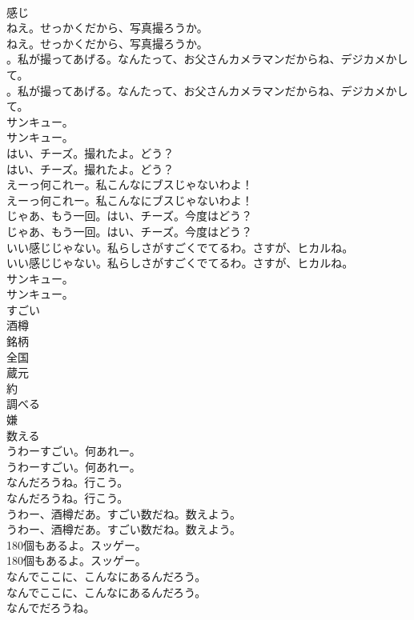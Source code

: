 \documentclass[8pt]{extreport}
\begin{document}
\begin{CJK}{UTF8}{min}
\\	感じ
\\	ねえ。せっかくだから、写真撮ろうか。	
\\	ねえ。せっかくだから、写真撮ろうか。 
\\	。私が撮ってあげる。なんたって、お父さんカメラマンだからね、デジカメかして。	
\\	。私が撮ってあげる。なんたって、お父さんカメラマンだからね、デジカメかして。 
\\	サンキュー。	
\\	サンキュー。 
\\	はい、チーズ。撮れたよ。どう？	
\\	はい、チーズ。撮れたよ。どう？ 
\\	えーっ何これー。私こんなにブスじゃないわよ！	
\\	えーっ何これー。私こんなにブスじゃないわよ！ 
\\	じゃあ、もう一回。はい、チーズ。今度はどう？	
\\	じゃあ、もう一回。はい、チーズ。今度はどう？ 
\\	いい感じじゃない。私らしさがすごくでてるわ。さすが、ヒカルね。	
\\	いい感じじゃない。私らしさがすごくでてるわ。さすが、ヒカルね。 
\\	サンキュー。	
\\	サンキュー。 
\\	すごい
\\	酒樽
\\	銘柄
\\	全国
\\	蔵元
\\	約
\\	調べる
\\	嫌
\\	数える
\\	うわーすごい。何あれー。	
\\	うわーすごい。何あれー。 
\\	なんだろうね。行こう。	
\\	なんだろうね。行こう。 
\\	うわー、酒樽だあ。すごい数だね。数えよう。	
\\	うわー、酒樽だあ。すごい数だね。数えよう。 
\\	180個もあるよ。スッゲー。	
\\	180個もあるよ。スッゲー。 
\\	なんでここに、こんなにあるんだろう。	
\\	なんでここに、こんなにあるんだろう。 
\\	なんでだろうね。	

\end{CJK}
\end{document}
